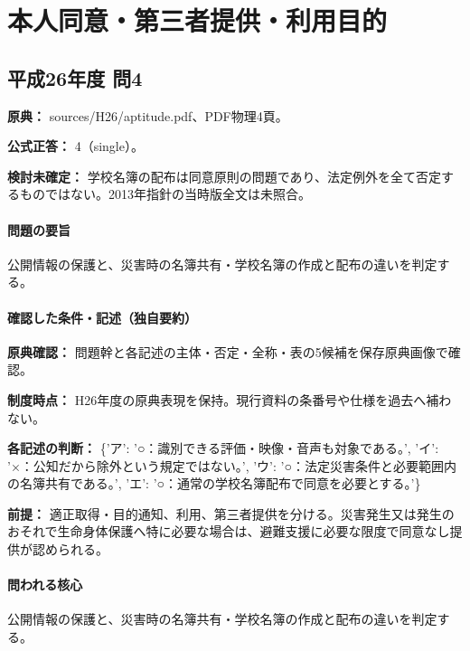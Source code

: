\section{本人同意・第三者提供・利用目的}

\subsection{平成26年度 問4}
\label{q:h26-reg-apt-04}

\noindent\textbf{原典：} sources/H26/aptitude.pdf、PDF物理4頁。

\textbf{公式正答：} 4（single）。

\par\textbf{検討未確定：} 学校名簿の配布は同意原則の問題であり、法定例外を全て否定するものではない。2013年指針の当時版全文は未照合。

\paragraph{問題の要旨} 公開情報の保護と、災害時の名簿共有・学校名簿の作成と配布の違いを判定する。

\paragraph{確認した条件・記述（独自要約）}\mbox{}\par

\noindent\textbf{原典確認：} 問題幹と各記述の主体・否定・全称・表の5候補を保存原典画像で確認。\par

\noindent\textbf{制度時点：} H26年度の原典表現を保持。現行資料の条番号や仕様を過去へ補わない。\par

\noindent\textbf{各記述の判断：} \{'ア': '○：識別できる評価・映像・音声も対象である。', 'イ': '×：公知だから除外という規定ではない。', 'ウ': '○：法定災害条件と必要範囲内の名簿共有である。', 'エ': '○：通常の学校名簿配布で同意を必要とする。'\}\par

\noindent\textbf{前提：} 適正取得・目的通知、利用、第三者提供を分ける。災害発生又は発生のおそれで生命身体保護へ特に必要な場合は、避難支援に必要な限度で同意なし提供が認められる。\par

\paragraph{問われる核心} 公開情報の保護と、災害時の名簿共有・学校名簿の作成と配布の違いを判定する。

